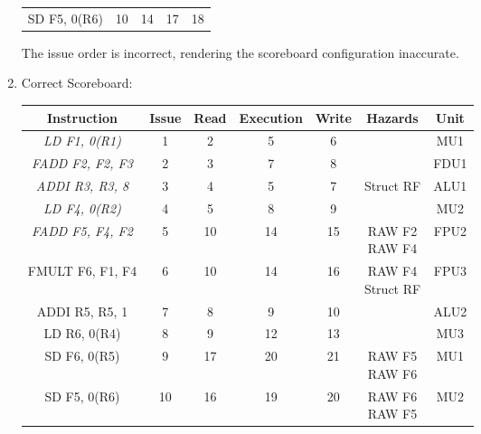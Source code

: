 \begin{enumerate}
\begin{table}[H]
\begin{tabular}{c|cccc}
            SD F5, 0(R6)             & 10             & 14            & 17                 & 18            
            \end{tabular}
        \end{table}
        The issue order is incorrect, rendering the scoreboard configuration inaccurate.
    \item Correct Scoreboard:
        \begin{table}[H]
            \centering
            \begin{tabular}{c|cccc|cc}
            \textbf{Instruction}     & \textbf{Issue} & \textbf{Read} & \textbf{Execution} & \textbf{Write} & \textbf{Hazards}               & \textbf{Unit} \\ \hline
            \textit{LD F1, 0(R1)}    & 1              & 2             & 5                  & 6              &                                & MU1           \\
            \textit{FADD F2, F2, F3} & 2              & 3             & 7                  & 8              &                                & FDU1          \\
            \textit{ADDI R3, R3, 8}  & 3              & 4             & 5                  & 7              & Struct RF                      & ALU1          \\
            \textit{LD F4, 0(R2)}    & 4              & 5             & 8                  & 9              &                                & MU2           \\
            \textit{FADD F5, F4, F2} & 5              & 10            & 14                 & 15             & \makecell{RAW F2 \\ RAW F4}    & FPU2          \\
            FMULT F6, F1, F4         & 6              & 10            & 14                 & 16             & \makecell{RAW F4 \\ Struct RF} & FPU3          \\
            ADDI R5, R5, 1           & 7              & 8             & 9                  & 10             &                                & ALU2          \\
            LD R6, 0(R4)             & 8              & 9             & 12                 & 13             &                                & MU3           \\
            SD F6, 0(R5)             & 9              & 17            & 20                 & 21             & \makecell{RAW F5 \\ RAW F6}    & MU1           \\
            SD F5, 0(R6)             & 10             & 16            & 19                 & 20             & \makecell{RAW F6 \\ RAW F5}    & MU2          
            \end{tabular}
        \end{table}
\end{enumerate}
